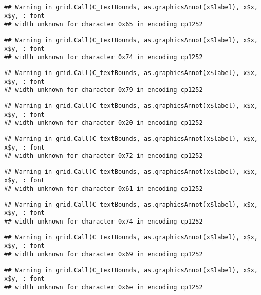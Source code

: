 \documentclass[
]{article}
\begin{document}
\begin{verbatim}
## Warning in grid.Call(C_textBounds, as.graphicsAnnot(x$label), x$x, x$y, : font
## width unknown for character 0x65 in encoding cp1252
\end{verbatim}

\begin{verbatim}
## Warning in grid.Call(C_textBounds, as.graphicsAnnot(x$label), x$x, x$y, : font
## width unknown for character 0x74 in encoding cp1252
\end{verbatim}

\begin{verbatim}
## Warning in grid.Call(C_textBounds, as.graphicsAnnot(x$label), x$x, x$y, : font
## width unknown for character 0x79 in encoding cp1252
\end{verbatim}

\begin{verbatim}
## Warning in grid.Call(C_textBounds, as.graphicsAnnot(x$label), x$x, x$y, : font
## width unknown for character 0x20 in encoding cp1252
\end{verbatim}

\begin{verbatim}
## Warning in grid.Call(C_textBounds, as.graphicsAnnot(x$label), x$x, x$y, : font
## width unknown for character 0x72 in encoding cp1252
\end{verbatim}

\begin{verbatim}
## Warning in grid.Call(C_textBounds, as.graphicsAnnot(x$label), x$x, x$y, : font
## width unknown for character 0x61 in encoding cp1252
\end{verbatim}

\begin{verbatim}
## Warning in grid.Call(C_textBounds, as.graphicsAnnot(x$label), x$x, x$y, : font
## width unknown for character 0x74 in encoding cp1252
\end{verbatim}

\begin{verbatim}
## Warning in grid.Call(C_textBounds, as.graphicsAnnot(x$label), x$x, x$y, : font
## width unknown for character 0x69 in encoding cp1252
\end{verbatim}

\begin{verbatim}
## Warning in grid.Call(C_textBounds, as.graphicsAnnot(x$label), x$x, x$y, : font
## width unknown for character 0x6e in encoding cp1252
\end{verbatim}
\end{document}
